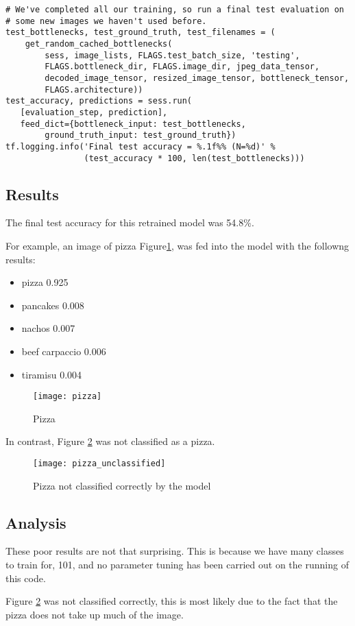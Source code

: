 \begin{lstlisting}
# We've completed all our training, so run a final test evaluation on
# some new images we haven't used before.
test_bottlenecks, test_ground_truth, test_filenames = (
    get_random_cached_bottlenecks(
        sess, image_lists, FLAGS.test_batch_size, 'testing',
        FLAGS.bottleneck_dir, FLAGS.image_dir, jpeg_data_tensor,
        decoded_image_tensor, resized_image_tensor, bottleneck_tensor,
        FLAGS.architecture))
test_accuracy, predictions = sess.run(
   [evaluation_step, prediction],
   feed_dict={bottleneck_input: test_bottlenecks,
        ground_truth_input: test_ground_truth})
tf.logging.info('Final test accuracy = %.1f%% (N=%d)' %
                (test_accuracy * 100, len(test_bottlenecks)))
\end{lstlisting}

\subsection*{Results}
The final test accuracy for this retrained model was 54.8\%.

For example, an image of pizza Figure\ref{fig:pizza}, was fed into the model with the followng results:
\begin{itemize}
    \item{pizza 0.925}
    \item{pancakes 0.008}
    \item{nachos 0.007}
    \item{beef carpaccio 0.006}
    \item{tiramisu 0.004}
\end{itemize}

\begin{figure}
     \texttt{[image: pizza]}
     \caption{Pizza}
     \label{fig:pizza}
\end{figure}

In contrast, Figure \ref{fig:pizza_unclassified} was not classified as a pizza.

\begin{figure}
     \texttt{[image: pizza\_unclassified]}
     \caption{Pizza not classified correctly by the model}
     \label{fig:pizza_unclassified}
\end{figure}

\subsection*{Analysis}
These poor results are not that surprising.
This is because we have many classes to train for, 101, and no parameter tuning has been carried out on the running of this code.

Figure \ref{fig:pizza_unclassified} was not classified correctly, this is most likely due to the fact that the pizza does not take up much of the image.

